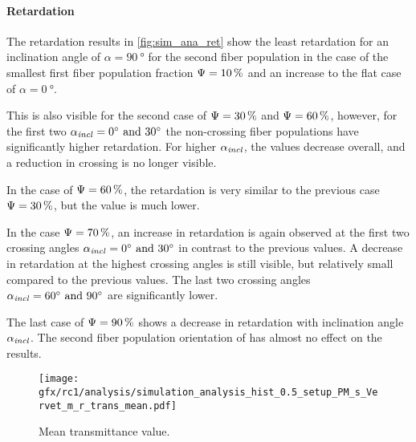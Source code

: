 \paragraph{Retardation}
The retardation results in \cref{fig:sim_ana_ret} show the least retardation for an inclination angle of $\alpha=\SI{90}{\degree}$ for the second fiber population in the case of the smallest first fiber population fraction $\textnormal{$\Psi$}=\SI{10}{\percent}$ and an increase to the flat case of $\alpha=\SI{0}{\degree}$.
\par
%
This is also visible for the second case of $\textnormal{$\Psi$}=\SI{30}{\percent}$ and $\textnormal{$\Psi$}=\SI{60}{\percent}$, however, for the first two $\modelInc = \SIlist{0;30}{\degree}$ the non-crossing fiber populations have significantly higher retardation.
For higher $\textnormal{$\alpha_{\mathit{incl}}$}$, the values decrease overall, and a reduction in crossing is no longer visible.
\par
%
In the case of $\textnormal{$\Psi$}=\SI{60}{\percent}$, the retardation is very similar to the previous case $\textnormal{$\Psi$}=\SI{30}{\percent}$, but the value is much lower.
\par
%
In the case $\textnormal{$\Psi$}=\SI{70}{\percent}$, an increase in retardation is again observed at the first two crossing angles $\modelInc=\SIlist{0;30}{\degree}$ in contrast to the previous values.
A decrease in retardation at the highest crossing angles is still visible, but relatively small compared to the previous values.
The last two crossing angles $\modelInc=\SIlist{60;90}{\degree}$ are significantly lower.
\par
%
The last case of $\textnormal{$\Psi$}=\SI{90}{\percent}$ shows a decrease in retardation with inclination angle $\textnormal{$\alpha_{\mathit{incl}}$}$.
The second fiber population orientation of has almost no effect on the results.
%
%
%
\begin{figure}[!p]
\centering
\texttt{[image: gfx/rc1/analysis/simulation\_analysis\_hist\_0.5\_setup\_PM\_s\_Vervet\_m\_r\_trans\_mean.pdf]}
\caption{Mean transmittance value. }
\label{fig:sim_ana_trans}
\end{figure}
%
